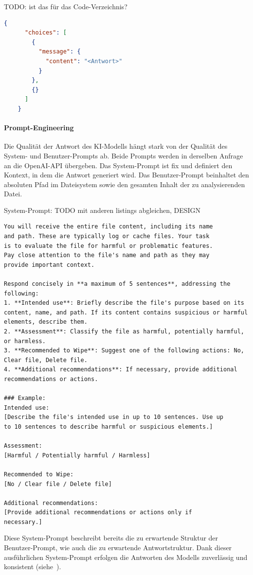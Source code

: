 \documentclass[a4paper,12pt]{report}
\begin{document}
    TODO: ist das für das Code-Verzeichnis?
    \begin{lstlisting}[language=json,label={lst:openai-response}]
    {
      "choices": [
        {
          "message": {
            "content": "<Antwort>"
          }
        },
        {}
      ]
    }
    \end{lstlisting}

    \paragraph*{Prompt-Engineering}
    Die Qualität der Antwort des KI-Modells hängt stark von der Qualität des System- und Benutzer-Prompts ab.
    Beide Prompts werden in derselben Anfrage an die OpenAI-API übergeben.
    Das System-Prompt ist fix und definiert den Kontext, in dem die Antwort generiert wird.
    Das Benutzer-Prompt beinhaltet den absoluten Pfad im Dateisystem sowie den gesamten Inhalt der zu analysierenden Datei.

    \clearpage
    System-Prompt: TODO mit anderen listings abgleichen, DESIGN

    \begin{lstlisting}[label={lst:system-prompt}]
You will receive the entire file content, including its name
and path. These are typically log or cache files. Your task
is to evaluate the file for harmful or problematic features.
Pay close attention to the file's name and path as they may
provide important context.

Respond concisely in **a maximum of 5 sentences**, addressing the following:
1. **Intended use**: Briefly describe the file's purpose based on its content, name, and path. If its content contains suspicious or harmful elements, describe them.
2. **Assessment**: Classify the file as harmful, potentially harmful, or harmless.
3. **Recommended to Wipe**: Suggest one of the following actions: No, Clear file, Delete file.
4. **Additional recommendations**: If necessary, provide additional recommendations or actions.

### Example:
Intended use:
[Describe the file's intended use in up to 10 sentences. Use up
to 10 sentences to describe harmful or suspicious elements.]

Assessment:
[Harmful / Potentially harmful / Harmless]

Recommended to Wipe:
[No / Clear file / Delete file]

Additional recommendations:
[Provide additional recommendations or actions only if
necessary.]
    \end{lstlisting}
    Diese System-Prompt beschreibt bereits die zu erwartende Struktur der Benutzer-Prompt, wie auch die zu erwartende Antwortstruktur.
    Dank dieser ausführlichen System-Prompt erfolgen die Antworten des Modells zuverlässig und konsistent (siehe~).
\end{document}
